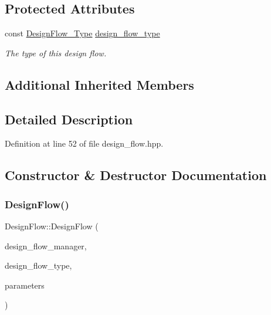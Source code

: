 \subsection*{Protected Attributes}
\begin{DoxyCompactItemize}
\item 
const \hyperlink{design__flow_8hpp_a0701ad2cbf08dc97b38caee3bbbff0c0}{Design\+Flow\+\_\+\+Type} \hyperlink{classDesignFlow_a5774fa7fbbd7935123f6705578fe50b0}{design\+\_\+flow\+\_\+type}
\begin{DoxyCompactList}\small\item\em The type of this design flow. \end{DoxyCompactList}\end{DoxyCompactItemize}
\subsection*{Additional Inherited Members}


\subsection{Detailed Description}


Definition at line 52 of file design\+\_\+flow.\+hpp.



\subsection{Constructor \& Destructor Documentation}
\mbox{\label{classDesignFlow_a4853245cdd1b2b0927fb582aa74c7b6d}} 
\subsubsection{\texorpdfstring{Design\+Flow()}{DesignFlow()}}
{\footnotesize\ttfamily Design\+Flow\+::\+Design\+Flow (\begin{DoxyParamCaption}\item[{const Design\+Flow\+Manager\+Const\+Ref}]{design\+\_\+flow\+\_\+manager,  }\item[{const \hyperlink{design__flow_8hpp_a0701ad2cbf08dc97b38caee3bbbff0c0}{Design\+Flow\+\_\+\+Type}}]{design\+\_\+flow\+\_\+type,  }\item[{const \hyperlink{Parameter_8hpp_a37841774a6fcb479b597fdf8955eb4ea}{Parameter\+Const\+Ref}}]{parameters }\end{DoxyParamCaption})}



